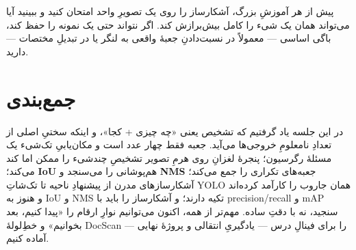 \documentclass[12pt,a4paper]{article}
\begin{document}
\begin{hoshdar}
پیش از هر آموزشِ بزرگ، آشکارساز را روی یک تصویرِ واحد امتحان کنید و ببینید آیا می‌تواند همان یک شیء را کامل بیش‌برازش کند. اگر نتواند حتی یک نمونه را حفظ کند، باگی اساسی — معمولاً در نسبت‌دادنِ جعبهٔ واقعی به لنگر یا در تبدیلِ مختصات — دارید.
\end{hoshdar}

\section{جمع‌بندی}

در این جلسه یاد گرفتیم که تشخیص یعنی «چه چیزی + کجا»، و اینکه سختیِ اصلی از تعدادِ نامعلومِ خروجی‌ها می‌آید. جعبه فقط چهار عدد است و مکان‌یابیِ تک‌شیء یک مسئلهٔ رگرسیون؛ پنجرهٔ لغزانِ روی هرمِ تصویر تشخیصِ چندشیء را ممکن اما کند می‌کند؛ \textbf{IoU} هم‌پوشانی را می‌سنجد و \textbf{NMS} جعبه‌های تکراری را جمع می‌کند؛ آشکارسازهای مدرن از پیشنهادِ ناحیه تا تک‌شاتِ YOLO همان جاروب را کارآمد کرده‌اند و هنوز به IoU و NMS تکیه دارند؛ و آشکارساز را باید با precision/recall و mAP سنجید، نه با دقتِ ساده. مهم‌تر از همه، اکنون می‌توانیم نوارِ ارقام را «پیدا کنیم، بعد بخوانیم» و خطِ‌لولهٔ DocScan را برای فینالِ درس — یادگیریِ انتقالی و پروژهٔ نهایی — آماده کنیم.
\end{document}
